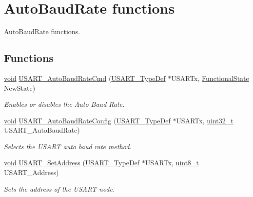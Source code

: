 \hypertarget{group___u_s_a_r_t___group3}{\section{Auto\-Baud\-Rate functions}
\label{group___u_s_a_r_t___group3}
}


Auto\-Baud\-Rate functions.  


\subsection*{Functions}
\begin{DoxyCompactItemize}
\item 
\hyperlink{group___n_a_m_e_ga18028b8badbf1ea7e704ccac3c488e82}{void} \hyperlink{group___u_s_a_r_t___group3_gae2c0458be954b184c7f8433375181555}{U\-S\-A\-R\-T\-\_\-\-Auto\-Baud\-Rate\-Cmd} (\hyperlink{struct_u_s_a_r_t___type_def}{U\-S\-A\-R\-T\-\_\-\-Type\-Def} $\ast$U\-S\-A\-R\-Tx, \hyperlink{group___exported__types_gac9a7e9a35d2513ec15c3b537aaa4fba1}{Functional\-State} New\-State)
\begin{DoxyCompactList}\small\item\em Enables or disables the Auto Baud Rate. \end{DoxyCompactList}\item 
\hyperlink{group___n_a_m_e_ga18028b8badbf1ea7e704ccac3c488e82}{void} \hyperlink{group___u_s_a_r_t___group3_ga067d3e47f4cd9b97dac725494c03b568}{U\-S\-A\-R\-T\-\_\-\-Auto\-Baud\-Rate\-Config} (\hyperlink{struct_u_s_a_r_t___type_def}{U\-S\-A\-R\-T\-\_\-\-Type\-Def} $\ast$U\-S\-A\-R\-Tx, \hyperlink{stdint_8h_a435d1572bf3f880d55459d9805097f62}{uint32\-\_\-t} U\-S\-A\-R\-T\-\_\-\-Auto\-Baud\-Rate)
\begin{DoxyCompactList}\small\item\em Selects the U\-S\-A\-R\-T auto baud rate method. \end{DoxyCompactList}\item 
\hyperlink{group___n_a_m_e_ga18028b8badbf1ea7e704ccac3c488e82}{void} \hyperlink{group___u_s_a_r_t___group3_ga65ec9928817f3f031dd9a4dfc95d6666}{U\-S\-A\-R\-T\-\_\-\-Set\-Address} (\hyperlink{struct_u_s_a_r_t___type_def}{U\-S\-A\-R\-T\-\_\-\-Type\-Def} $\ast$U\-S\-A\-R\-Tx, \hyperlink{stdint_8h_aba7bc1797add20fe3efdf37ced1182c5}{uint8\-\_\-t} U\-S\-A\-R\-T\-\_\-\-Address)
\begin{DoxyCompactList}\small\item\em Sets the address of the U\-S\-A\-R\-T node. \end{DoxyCompactList}\item 

\end{DoxyCompactItemize}

